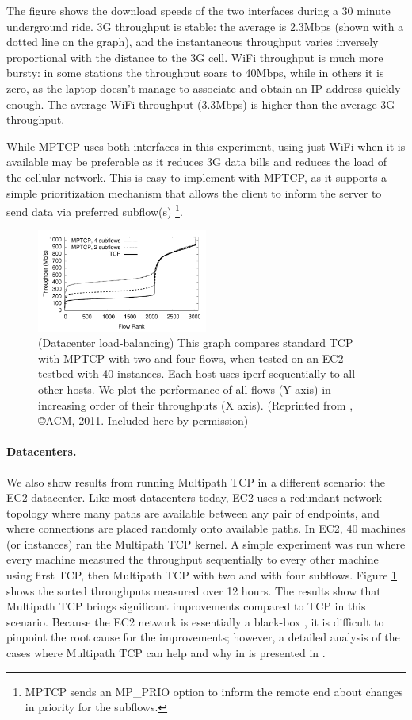 The figure shows the download speeds of the two interfaces during a 30 minute underground ride. 3G throughput is stable: the average is 
2.3Mbps (shown with a dotted line on the graph), and the instantaneous throughput varies inversely proportional with the distance 
to the 3G cell. WiFi throughput is much more bursty: in some stations the throughput soars to 40Mbps, while in others it is zero, as 
the laptop doesn't manage to associate and obtain an IP address quickly enough. The average WiFi throughput (3.3Mbps) is higher 
than the average 3G throughput.

While MPTCP uses both interfaces in this experiment, using just WiFi when it is available may be preferable as it reduces 3G data bills
and reduces the load of the cellular network. This is easy to implement with MPTCP, as it supports a simple  prioritization mechanism 
that allows the client to inform the server to send data via preferred subflow(s) \footnote{MPTCP sends an MP\_PRIO option to 
inform the remote end about changes in priority for the subflows.}. 


\begin{figure}[t]
\centering
\includegraphics[width=0.5\textwidth]{figures/figure3}
\caption{(Datacenter load-balancing) This graph compares standard TCP with MPTCP 
with two and four flows, when tested on an EC2 testbed with 40 instances. Each host 
uses iperf sequentially to all other hosts. We plot the performance of all flows (Y axis)
in increasing order of their throughputs (X axis). (Reprinted from
\cite{raiciu2011improving}, \copyright ACM, 2011. Included here by permission)}
\label{fig:mptcp3}
\end{figure}

\paragraph{Datacenters.} We also show results from running Multipath TCP in a different scenario: the EC2 datacenter.
Like most datacenters today, EC2 uses a redundant network topology where many paths are 
available between any pair of endpoints, and where connections are placed randomly 
onto available paths. In EC2, 40 machines (or instances) ran the 
Multipath TCP kernel. A simple experiment was run where every machine measured
the throughput sequentially to every other machine using first TCP, then Multipath 
TCP with two and with four subflows. Figure \ref{fig:mptcp3} shows the sorted throughputs measured over 
12 hours. The results show that Multipath TCP brings significant improvements compared 
to TCP in this scenario. Because the EC2 network is essentially a black-box , it is 
difficult to pinpoint the root cause for the improvements; however, a
detailed analysis of the cases where Multipath TCP can help and why in is presented in 
\cite{raiciu2011improving}.

